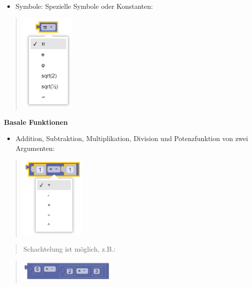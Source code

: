 \documentclass[
  letterpaper,
  DIV=11]{scrreprt}
\providecommand{\tightlist}{%
  \setlength{\itemsep}{0pt}\setlength{\parskip}{0pt}}\usepackage{longtable,booktabs,array}
\begin{document}
\begin{tcolorbox}
\begin{itemize}
\tightlist
\item
  Symbole: Spezielle Symbole oder Konstanten:
\end{itemize}

\begin{quote}
\includegraphics[width=1.04167in,height=\textheight]{img/screenshot-blockly-math-symbol-01.png}
\end{quote}

\textbf{Basale Funktionen}

\begin{itemize}
\tightlist
\item
  Addition, Subtraktion, Multiplikation, Division und Potenzfunktion von
  zwei Argumenten:
\end{itemize}

\begin{quote}
\includegraphics[width=1.25in,height=\textheight]{img/screenshot-blockly-math-operation-01.png}
\end{quote}

\begin{quote}
Schachtelung ist möglich, z.B.:
\end{quote}

\begin{quote}
\includegraphics[width=1.875in,height=\textheight]{img/screenshot-blockly-math-operation-example-01.png}
\end{quote}


\end{tcolorbox}
\end{document}
